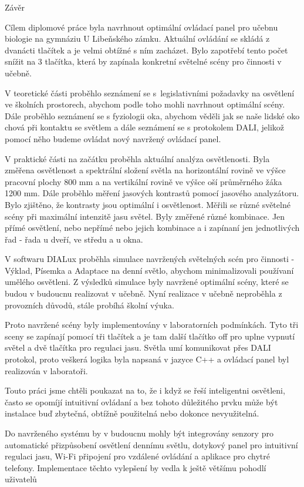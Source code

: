 \nonum\chap Závěr

Cílem diplomové práce byla navrhnout optimální ovládací panel pro učebnu biologie na gymnáziu U Libeňského zámku. Aktuální
ovládání se skládá z dvanácti tlačítek a je velmi obtížné s ním zacházet. Bylo zapotřebí tento počet snížit na 3 tlačítka,
která by zapínala konkretní světelné scény pro činnosti v učebně.

V teoretické části proběhlo seznámení se s~legislativními požadavky na osvětlení ve školních prostorech, abychom podle toho mohli
navrhnout optimální scény. Dále proběhlo seznámení se s fyziologii oka, abychom věděli jak se naše lidské oko chová při kontaktu
se světlem a dále seznámení se s protokolem DALI, jelikož pomocí něho budeme ovládat nový navržený ovládací panel.

V praktické části na začátku proběhla aktuální analýza osvětlenosti. Byla změřena osvětlenost a spektrální složení světla
na horizontální rovině ve výšce pracovní plochy 800 mm a na vertikální rovině ve výšce oší průměrného žáka 1200 mm.
Dále proběhlo měření jasových kontrastů pomocí jasového analyzátoru. Bylo zjištěno, že kontrasty jsou optimální i osvětlenost.
Měřili se různé světelné scény při maximální intenzitě jasu světel. Byly změřené různé kombinace.
Jen přímé osvětlení, nebo nepřímé nebo jejich kombinace a i zapínaní jen jednotlivých řad - řada u dveří, ve středu a u okna.

V softwaru DIALux proběhla simulace navržených světelných scén pro činnosti - Výklad, Písemka a Adaptace na denní světlo, abychom
minimalizovali používaní umělého osvětleni. Z výsledků simulace byly navržené optimální scény,
které se budou v budoucnu realizovat v učebně.
Nyní realizace v učebně neproběhla z provozních důvodů, stále probíhá školní výuka.

Proto navržené scény byly implementovány v laboratorních podmínkách.
Tyto tři sceny se zapínají pomocí tři tlačítek a je tam další tlačítko
off pro uplne vypnutí světel a dvě tlačítka pro regulaci jasu.
Světla umí komunikovat přes DALI protokol, proto veškerá logika byla
napsaná v jazyce C++ a ovládací panel byl realizován v laboratoři.

Touto práci jsme chtěli poukazat na to, že i když se řeší inteligentni osvětleni,
často se opomíjí intuitivní ovládaní a bez tohoto
důležitého prvku může být instalace buď zbytečná, obtížně použitelná nebo dokonce nevyužitelná.

Do navrženého systému by v budoucnu mohly být integrovány senzory pro automatické
přizpůsobení osvětlení dennímu světlu,
dotykový panel pro intuitivní regulaci jasu,
Wi-Fi připojení pro vzdálené ovládání a aplikace pro chytré telefony.
Implementace těchto vylepšení by vedla k ještě většímu pohodlí uživatelů

